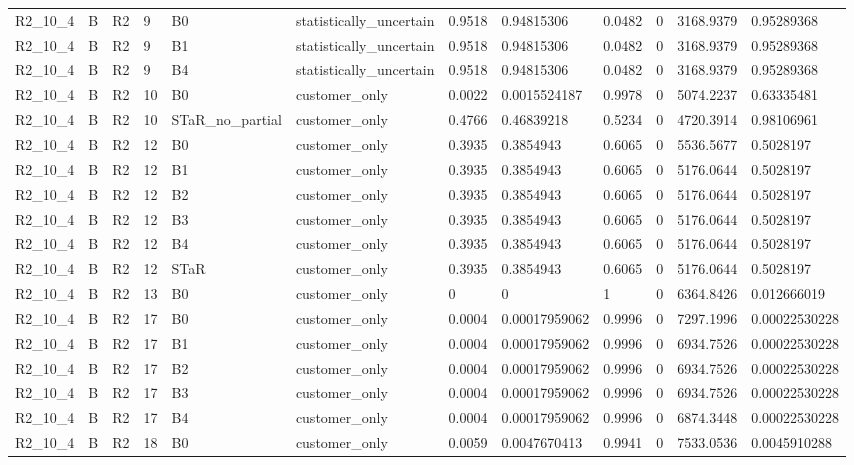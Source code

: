\begin{longtable}{llllllllllll}
R2\_10\_4 & B & R2 & 9 & B0 & statistically\_uncertain & 0.9518 & 0.94815306 & 0.0482 & 0 & 3168.9379 & 0.95289368 \\
R2\_10\_4 & B & R2 & 9 & B1 & statistically\_uncertain & 0.9518 & 0.94815306 & 0.0482 & 0 & 3168.9379 & 0.95289368 \\
R2\_10\_4 & B & R2 & 9 & B4 & statistically\_uncertain & 0.9518 & 0.94815306 & 0.0482 & 0 & 3168.9379 & 0.95289368 \\
R2\_10\_4 & B & R2 & 10 & B0 & customer\_only & 0.0022 & 0.0015524187 & 0.9978 & 0 & 5074.2237 & 0.63335481 \\
R2\_10\_4 & B & R2 & 10 & STaR\_no\_partial & customer\_only & 0.4766 & 0.46839218 & 0.5234 & 0 & 4720.3914 & 0.98106961 \\
R2\_10\_4 & B & R2 & 12 & B0 & customer\_only & 0.3935 & 0.3854943 & 0.6065 & 0 & 5536.5677 & 0.5028197 \\
R2\_10\_4 & B & R2 & 12 & B1 & customer\_only & 0.3935 & 0.3854943 & 0.6065 & 0 & 5176.0644 & 0.5028197 \\
R2\_10\_4 & B & R2 & 12 & B2 & customer\_only & 0.3935 & 0.3854943 & 0.6065 & 0 & 5176.0644 & 0.5028197 \\
R2\_10\_4 & B & R2 & 12 & B3 & customer\_only & 0.3935 & 0.3854943 & 0.6065 & 0 & 5176.0644 & 0.5028197 \\
R2\_10\_4 & B & R2 & 12 & B4 & customer\_only & 0.3935 & 0.3854943 & 0.6065 & 0 & 5176.0644 & 0.5028197 \\
R2\_10\_4 & B & R2 & 12 & STaR & customer\_only & 0.3935 & 0.3854943 & 0.6065 & 0 & 5176.0644 & 0.5028197 \\
R2\_10\_4 & B & R2 & 13 & B0 & customer\_only & 0 & 0 & 1 & 0 & 6364.8426 & 0.012666019 \\
R2\_10\_4 & B & R2 & 17 & B0 & customer\_only & 0.0004 & 0.00017959062 & 0.9996 & 0 & 7297.1996 & 0.00022530228 \\
R2\_10\_4 & B & R2 & 17 & B1 & customer\_only & 0.0004 & 0.00017959062 & 0.9996 & 0 & 6934.7526 & 0.00022530228 \\
R2\_10\_4 & B & R2 & 17 & B2 & customer\_only & 0.0004 & 0.00017959062 & 0.9996 & 0 & 6934.7526 & 0.00022530228 \\
R2\_10\_4 & B & R2 & 17 & B3 & customer\_only & 0.0004 & 0.00017959062 & 0.9996 & 0 & 6934.7526 & 0.00022530228 \\
R2\_10\_4 & B & R2 & 17 & B4 & customer\_only & 0.0004 & 0.00017959062 & 0.9996 & 0 & 6874.3448 & 0.00022530228 \\
R2\_10\_4 & B & R2 & 18 & B0 & customer\_only & 0.0059 & 0.0047670413 & 0.9941 & 0 & 7533.0536 & 0.0045910288 \\

\end{longtable}
